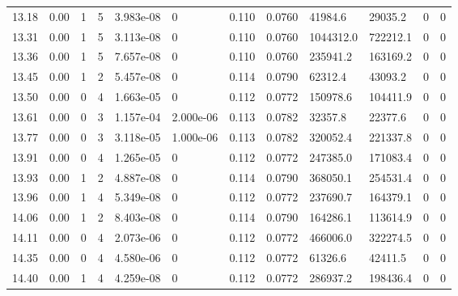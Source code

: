 \documentclass[preview]{standalone}
\begin{document}
{{{\begin{tabular}{L{1.2cm}C{1.2cm} C{0.3cm}C{0.5cm} C{1.4cm}C{1.4cm} C{1.4cm}C{1.4cm} C{1.6cm}C{1.6cm} C{1.6cm}C{1.6cm}}
  13.18  &  0.00  & 1     &  5 &  3.983e-08  & 0  &  0.110&   0.0760& 41984.6 & 29035.2   &  0 & 0  \\ 
  13.31  &  0.00  & 1     &  5 &  3.113e-08  & 0  &  0.110&   0.0760& 1044312.0 & 722212.1   &  0 & 0  \\ 
  13.36  &  0.00  & 1     &  5 &  7.657e-08  & 0  &  0.110&   0.0760& 235941.2 & 163169.2   &  0 & 0  \\ 
  13.45  &  0.00  & 1     &  2 &  5.457e-08  & 0  &  0.114&   0.0790& 62312.4 & 43093.2   &  0 & 0  \\ 
  13.50  &  0.00  & 0     &  4 &  1.663e-05  & 0  &  0.112&   0.0772& 150978.6 & 104411.9   &  0 & 0  \\ 
  13.61  &  0.00  & 0     &  3 &  1.157e-04  & 2.000e-06  &  0.113&   0.0782& 32357.8 & 22377.6   &  0 & 0  \\ 
  13.77  &  0.00  & 0     &  3 &  3.118e-05  & 1.000e-06  &  0.113&   0.0782& 320052.4 & 221337.8   &  0 & 0  \\ 
  13.91  &  0.00  & 0     &  4 &  1.265e-05  & 0  &  0.112&   0.0772& 247385.0 & 171083.4   &  0 & 0  \\ 
  13.93  &  0.00  & 1     &  2 &  4.887e-08  & 0  &  0.114&   0.0790& 368050.1 & 254531.4   &  0 & 0  \\ 
  13.96  &  0.00  & 1     &  4 &  5.349e-08  & 0  &  0.112&   0.0772& 237690.7 & 164379.1   &  0 & 0  \\ 
  14.06  &  0.00  & 1     &  2 &  8.403e-08  & 0  &  0.114&   0.0790& 164286.1 & 113614.9   &  0 & 0  \\ 
  14.11  &  0.00  & 0     &  4 &  2.073e-06  & 0  &  0.112&   0.0772& 466006.0 & 322274.5   &  0 & 0  \\ 
  14.35  &  0.00  & 0     &  4 &  4.580e-06  & 0  &  0.112&   0.0772& 61326.6 & 42411.5   &  0 & 0  \\ 
  14.40  &  0.00  & 1     &  4 &  4.259e-08  & 0  &  0.112&   0.0772& 286937.2 & 198436.4   &  0 & 0  \\ 
\hline 
\end{tabular} 

}}}
\end{document}
